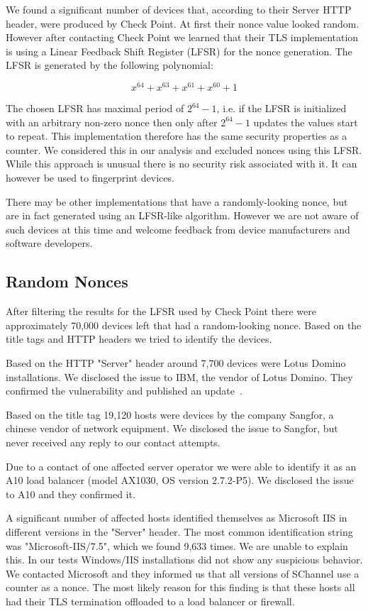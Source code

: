 \documentclass[10pt, a4paper]{article}
\begin{document}
We found a significant number of devices that, according to their Server HTTP header, were produced by Check Point. At first their nonce value looked
random. However after contacting Check Point we learned that their TLS implementation is using a Linear Feedback Shift Register (LFSR) for the nonce generation. The LFSR is generated by the following polynomial:

$$x^{64} + x^{63} + x^{61} + x^{60} + 1$$

The chosen LFSR has maximal period of $2^{64}-1$, i.e. if the LFSR is initialized with an arbitrary non-zero nonce then only after $2^{64}-1$ updates the values start to repeat. This implementation therefore has the same security properties as
a counter. We considered this in our analysis and excluded nonces using this LFSR. While this approach is unusual there is no security risk associated with it.
It can however be used to fingerprint devices.

There may be other implementations that have a randomly-looking nonce, but are in fact generated using an LFSR-like algorithm. However we are not aware of such devices at this time and welcome feedback from device manufacturers and software developers.

\subsection{Random Nonces}

After filtering the results for the LFSR used by Check Point there were approximately 70,000 devices left
that had a random-looking nonce. Based on the title tags and HTTP headers we tried to identify the devices.

Based on the HTTP "Server" header around 7,700 devices were Lotus Domino installations. We disclosed the issue to IBM, the vendor
of Lotus Domino. They confirmed the vulnerability and published an update~\cite{ibm2016}.

Based on the title tag 19,120 hosts were devices by the company Sangfor, a chinese vendor of network equipment.
We disclosed the issue to Sangfor, but never received any reply to our contact attempts.

Due to a contact of one affected server operator we were able to identify it as an A10 load balancer
(model AX1030, OS version 2.7.2-P5). We disclosed the issue to A10 and they confirmed it.

A significant number of affected hosts identified themselves as Microsoft IIS in different versions in the "Server" header. The most common identification string was "Microsoft-IIS/7.5", which we
found 9,633 times.
We are unable to explain this. In our tests Windows/IIS installations did not show any suspicious behavior.
We contacted Microsoft and they informed us that all versions of SChannel use a counter as a nonce.
The most likely reason for this finding is that
these hosts all had their TLS termination offloaded to a load balancer or firewall.
\end{document}
